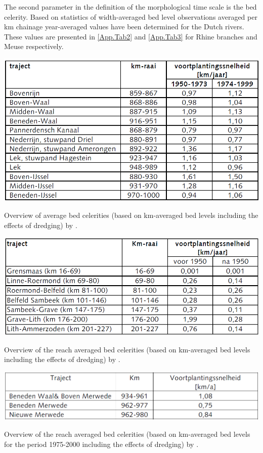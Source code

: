 The second parameter in the definition of the morphological time scale is the bed celerity.
Based on statistics of width-averaged bed level observations averaged per km chainage year-averaged values have been determined \citep{RIZA2005} for the Dutch rivers.
These values are presented in \autoref{App.Tab2} and \autoref{App.Tab3} for Rhine branches and Meuse respectively.

\begin{table}
\includegraphics[width=\columnwidth]{figures/Tab2.png}
\caption{Overview of average bed celerities (based on km-averaged bed levels including the effects of dredging) by \citet{RIZA2005}.}
\label{App.Tab2Again}
\end{table}

\begin{table}
\includegraphics[width=\columnwidth]{figures/Tab3.png}
\caption{Overview of the reach averaged bed celerities (based on km-averaged bed levels including the effects of dredging) by \citet{Waterdienst2008}.}
\label{App.Tab3Again}
\end{table}

\begin{table}
\includegraphics[width=\columnwidth]{figures/Tab4.png}
\caption{Overview of the reach averaged bed celerities (based on km-averaged bed levels for the period 1975-2000 including the effects of dredging) by \citet{RIZA2007}.}
\label{App.Tab4}
\end{table}

